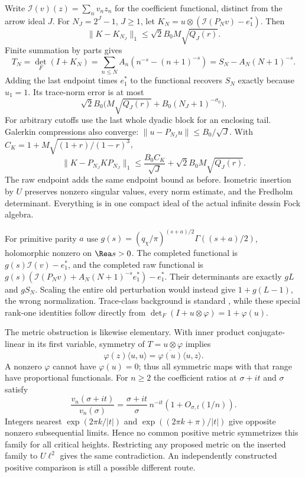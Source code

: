 \documentclass[11pt]{article}
\theoremstyle{definition}\newtheorem{definition}[theorem]{Definition}
\theoremstyle{remark}\newtheorem{remark}[theorem]{Remark}
\begin{document}
Write $\mathcal I(v)(z)=\sum_n v_nz_n$ for the coefficient functional, distinct from the arrow ideal $J$. For $N_J=2^J-1$, $J\ge1$, let $K_N=u\otimes(\mathcal I(P_Nv)-e_1^*)$. Then
\[
 \|K-K_{N_J}\|_1\le\sqrt2 B_0M\sqrt{Q_J(r)}.
\]
Finite summation by parts gives
\[
 T_N=\det_F(I+K_N)
 =\sum_{n\le N}A_n(n^{-s}-(n+1)^{-s})
 =S_N-A_N(N+1)^{-s}.
\]
Adding the last endpoint times $e_1^*$ to the functional recovers $S_N$ exactly because $u_1=1$. Its trace-norm error is at most
\[
 \sqrt2 B_0\bigl(M\sqrt{Q_J(r)}+B_0(N_J+1)^{-\sigma_0}\bigr).
\]
For arbitrary cutoffs use the last whole dyadic block for an enclosing tail. Galerkin compressions also converge: $\|u-P_{N_J}u\|\le B_0/\sqrt J$. With $C_K=1+M\sqrt{(1+r)/(1-r)^3}$,
\[
 \|K-P_{N_J}KP_{N_J}\|_1
 \le\frac{B_0 C_K}{\sqrt J}+\sqrt2 B_0M\sqrt{Q_J(r)}.
\]
The raw endpoint adds the same endpoint bound as before. Isometric insertion by $U$ preserves nonzero singular values, every norm estimate, and the Fredholm determinant. Everything is in one compact ideal of the actual infinite dessin Fock algebra.

For primitive parity $a$ use $g(s)=(q_\chi/\pi)^{(s+a)/2}\Gamma((s+a)/2)$, holomorphic nonzero on $\Rea s>0$. The completed functional is $g(s)\mathcal I(v)-e_1^*$, and the completed raw functional is $g(s)(\mathcal I(P_Nv)+A_N(N+1)^{-s}e_1^*)-e_1^*$. Their determinants are exactly $gL$ and $gS_N$. Scaling the entire old perturbation would instead give $1+g(L-1)$, the wrong normalization. Trace-class background is standard \cite{Bornemann}, while these special rank-one identities follow directly from $\det_F(I+u\otimes\varphi)=1+\varphi(u)$.

The metric obstruction is likewise elementary. With inner product conjugate-linear in its first variable, symmetry of $T=u\otimes\varphi$ implies
\[
 \varphi(z)\langle u,u\rangle=\overline{\varphi(u)}\langle u,z\rangle.
\]
A nonzero $\varphi$ cannot have $\varphi(u)=0$; thus all symmetric maps with that range have proportional functionals. For $n\ge2$ the coefficient ratios at $\sigma+it$ and $\sigma$ satisfy
\[
 \frac{v_n(\sigma+it)}{v_n(\sigma)}
 =\frac{\sigma+it}{\sigma}\,n^{-it}(1+O_{\sigma,t}(1/n)).
\]
Integers nearest $\exp(2\pi k/|t|)$ and $\exp((2\pi k+\pi)/|t|)$ give opposite nonzero subsequential limits. Hence no common positive metric symmetrizes this family for all critical heights. Restricting any proposed metric on the inserted family to $U\ell^2$ gives the same contradiction. An independently constructed positive comparison is still a possible different route.
\end{document}
